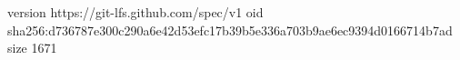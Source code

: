 version https://git-lfs.github.com/spec/v1
oid sha256:d736787e300c290a6e42d53efc17b39b5e336a703b9ae6ec9394d0166714b7ad
size 1671
